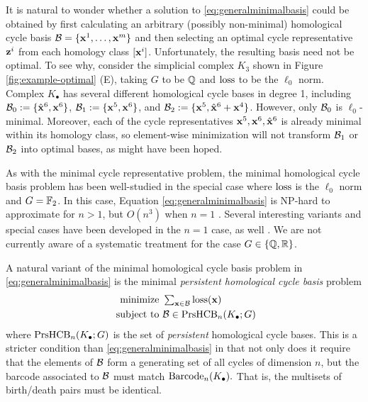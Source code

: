 It is natural to wonder whether a solution to \pr \eqref{eq:generalminimalbasis} could be obtained by first calculating an arbitrary (possibly non-minimal) homological cycle basis $\mathcal B = \{\mathbf{x}^1, \ldots, \mathbf{x}^m \}$ and then selecting an optimal cycle representative ${\mathbf z}^i$ from each homology class $[\mathbf{x}^i]$.    Unfortunately, the resulting basis need not be optimal.  To see why, consider the simplicial complex $K_3$ shown in Figure \ref{fig:example-optimal} (E), taking $G$ to be $\mathbb{Q}$ and $\mathrm{loss}$ to be the $\ell_0$ norm.  Complex $K_{\bullet}$ has several different homological cycle bases in degree 1, including  $\mathcal B_0: = \{\hat {\mathbf{x}}^6, \mathbf{x}^6\}$, $\mathcal B_1: = \{\mathbf{x}^5,  \mathbf{x}^6\}$, and $\mathcal B_2: = \{ \mathbf{x}^5,  \hat {\mathbf{x}}^6 + \mathbf{x}^4\}$.  However, only $\mathcal B_0$ is $\ell_0$-minimal.  Moreover, each of the cycle representatives $\mathbf{x}^5, \mathbf{x}^6, \hat {\mathbf{x}}^6$ is already minimal within its homology class, so element-wise minimization will not transform  $\mathcal B_1$ or $\mathcal B_2$ into optimal bases, as might have been hoped.  


As with the minimal cycle representative problem, the minimal homological cycle basis problem has been well-studied in the special case where $\mathrm{loss}$ is the $\ell_0$ norm and $G = \mathbb{F}_2$.  In this case, Equation \eqref{eq:generalminimalbasis} is NP-hard to approximate for $n>1$, but  $O(n^3)$ when $n=1$ \cite{dey2018efficient}. Several interesting variants and special cases have been developed in the $n=1$ case, as well \cite{shortestonedimension, erickson2005greedy, chen2010measuring}.  We are not currently aware of a systematic treatment for the case $G \in \{\mathbb{Q}, \mathbb{R}\}$.


A natural variant of the minimal homological cycle basis problem in \eq \eqref{eq:generalminimalbasis} is the minimal \emph{persistent homological cycle basis} problem  
\begin{align}
   \begin{split}
    \text{minimize } & \textstyle \sum_{\mathbf{x} \in \mathcal B} \mathrm{loss}(\mathbf{x}) \\
    \text{ subject to } & \mathcal B \in \mathrm{PrsHCB}_n(K_\bullet ; G)
   \end{split}
   \label{eq:persistentminimalbasis}
\end{align}
where $\mathrm{PrsHCB}_n(K_\bullet; G)$ is the set of \emph{persistent} homological cycle bases. This is a stricter condition than \pr \eqref{eq:generalminimalbasis} in that not only does it require that the elements of $\mathcal B$ form a generating set of all cycles of dimension $n$, but the barcode associated to $\mathcal B$ must match $\mathrm{Barcode}_n(K_\bullet).$ That is, the multisets of birth/death pairs must be identical.

